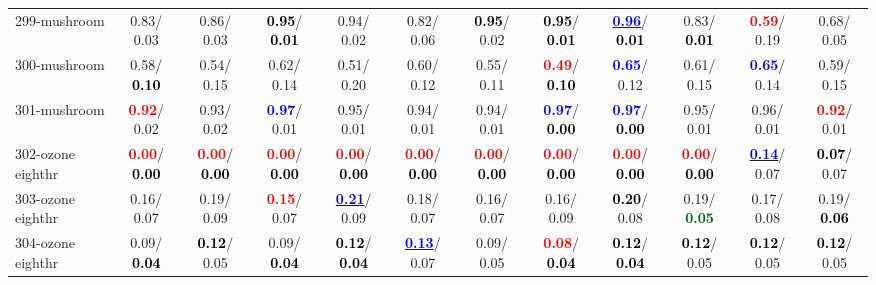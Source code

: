 \begin{table}[h]
\begin{center}
{\begin{tabular}{lc|c|c|c|c|c|c|c|c|c|c}
299-mushroom &   0.83/  0.03 &   0.86/  0.03 & \textcolor{black}{\textbf{  0.95}}/\textcolor{black}{\textbf{  0.01}} &   0.94/  0.02 &   0.82/  0.06 & \textcolor{black}{\textbf{  0.95}}/  0.02 & \textcolor{black}{\textbf{  0.95}}/\textcolor{black}{\textbf{  0.01}} & \underline{\textcolor{blue}{\textbf{  0.96}}}/\textcolor{black}{\textbf{  0.01}} &   0.83/\textcolor{black}{\textbf{  0.01}} & \textcolor{red}{\textbf{  0.59}}/  0.19 &   0.68/  0.05 \\
300-mushroom &   0.58/\textcolor{black}{\textbf{  0.10}} &   0.54/  0.15 &   0.62/  0.14 &   0.51/  0.20 &   0.60/  0.12 &   0.55/  0.11 & \textcolor{red}{\textbf{  0.49}}/\textcolor{black}{\textbf{  0.10}} & \textcolor{blue}{\textbf{  0.65}}/  0.12 &   0.61/  0.15 & \textcolor{blue}{\textbf{  0.65}}/  0.14 &   0.59/  0.15 \\
301-mushroom & \textcolor{red}{\textbf{  0.92}}/  0.02 &   0.93/  0.02 & \textcolor{blue}{\textbf{  0.97}}/  0.01 &   0.95/  0.01 &   0.94/  0.01 &   0.94/  0.01 & \textcolor{blue}{\textbf{  0.97}}/\textcolor{black}{\textbf{  0.00}} & \textcolor{blue}{\textbf{  0.97}}/\textcolor{black}{\textbf{  0.00}} &   0.95/  0.01 &   0.96/  0.01 & \textcolor{red}{\textbf{  0.92}}/  0.01 \\
302-ozone eighthr & \textcolor{red}{\textbf{  0.00}}/\textcolor{black}{\textbf{  0.00}} & \textcolor{red}{\textbf{  0.00}}/\textcolor{black}{\textbf{  0.00}} & \textcolor{red}{\textbf{  0.00}}/\textcolor{black}{\textbf{  0.00}} & \textcolor{red}{\textbf{  0.00}}/\textcolor{black}{\textbf{  0.00}} & \textcolor{red}{\textbf{  0.00}}/\textcolor{black}{\textbf{  0.00}} & \textcolor{red}{\textbf{  0.00}}/\textcolor{black}{\textbf{  0.00}} & \textcolor{red}{\textbf{  0.00}}/\textcolor{black}{\textbf{  0.00}} & \textcolor{red}{\textbf{  0.00}}/\textcolor{black}{\textbf{  0.00}} & \textcolor{red}{\textbf{  0.00}}/\textcolor{black}{\textbf{  0.00}} & \underline{\textcolor{blue}{\textbf{  0.14}}}/  0.07 & \textcolor{black}{\textbf{  0.07}}/  0.07 \\ \hline
303-ozone eighthr &   0.16/  0.07 &   0.19/  0.09 & \textcolor{red}{\textbf{  0.15}}/  0.07 & \underline{\textcolor{blue}{\textbf{  0.21}}}/  0.09 &   0.18/  0.07 &   0.16/  0.07 &   0.16/  0.09 & \textcolor{black}{\textbf{  0.20}}/  0.08 &   0.19/\textcolor{darkgreen}{\textbf{  0.05}} &   0.17/  0.08 &   0.19/\textcolor{black}{\textbf{  0.06}} \\
304-ozone eighthr &   0.09/\textcolor{black}{\textbf{  0.04}} & \textcolor{black}{\textbf{  0.12}}/  0.05 &   0.09/\textcolor{black}{\textbf{  0.04}} & \textcolor{black}{\textbf{  0.12}}/\textcolor{black}{\textbf{  0.04}} & \underline{\textcolor{blue}{\textbf{  0.13}}}/  0.07 &   0.09/  0.05 & \textcolor{red}{\textbf{  0.08}}/\textcolor{black}{\textbf{  0.04}} & \textcolor{black}{\textbf{  0.12}}/\textcolor{black}{\textbf{  0.04}} & \textcolor{black}{\textbf{  0.12}}/  0.05 & \textcolor{black}{\textbf{  0.12}}/  0.05 & \textcolor{black}{\textbf{  0.12}}/  0.05 \\

\end{tabular}}
\end{center}
\end{table}
